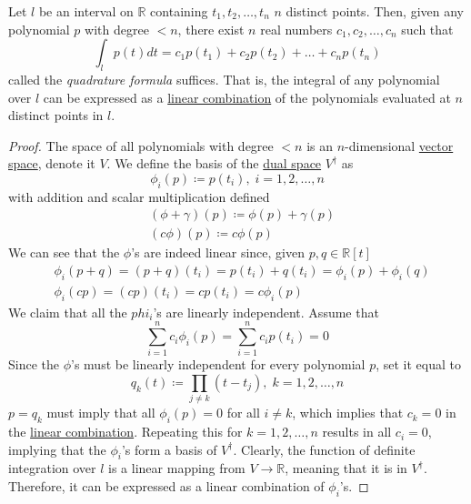  \begin{theorem}
    \label{thm:quadrature-formula}
    Let $l$ be an interval on $\mathbb{R}$ containing $t_1, t_2, \ldots, t_n$ $n$ distinct points. Then, given any polynomial $p$ with degree $< n$, there exist $n$ real numbers $c_1, c_2, \ldots, c_n$ such that
    \begin{equation}
      \int_l p(t) d t = c_1 p(t_1) + c_2 p(t_2) + \ldots + c_n p(t_n)
    \end{equation}
    called the \textit{quadrature formula} suffices. That is, the integral of any polynomial over $l$ can be expressed as a \hyperref[def:linear-combination]{linear combination} of the polynomials evaluated at $n$ distinct points in $l$. 
  \end{theorem}
  \begin{proof}
    The space of all polynomials with degree $< n$ is an $n$-dimensional \hyperref[def:vector-space]{vector space}, denote it $V$. We define the basis of the \hyperref[def:dual-space]{dual space} $V^\dagger$ as 
    \begin{equation}
      \phi_i (p) \coloneqq p(t_i), \; i = 1, 2, \ldots, n
    \end{equation}
    with addition and scalar multiplication defined
    \begin{align*}
      & (\phi + \gamma) (p) \coloneqq \phi(p) + \gamma(p) \\
      & (c \phi) (p) \coloneqq c \phi (p) 
    \end{align*}
    We can see that the $\phi$'s are indeed linear since, given $p, q \in \mathbb{R}[t]$
    \begin{align*}
      & \phi_i (p + q) = (p + q) (t_i) = p(t_i) + q(t_i) = \phi_i (p) + \phi_i (q) \\
      & \phi_i (c p) = (c p) (t_i) = c p(t_i) = c \phi_i (p)
    \end{align*}
    We claim that all the $phi_i$'s are linearly independent. Assume that 
    \begin{equation}
      \sum_{i=1}^n c_i \phi_i (p) = \sum_{i=1}^n c_i p(t_i) = 0
    \end{equation}
    Since the $\phi$'s must be linearly independent for every polynomial $p$, set it equal to
    \begin{equation}
      q_k (t) \coloneqq \prod_{j \neq k} (t - t_j), \; k = 1, 2, \ldots, n
    \end{equation}
    $p = q_k$ must imply that all $\phi_i (p) = 0$ for all $i \neq k$, which implies that $c_k = 0$ in the \hyperref[def:linear-combination]{linear combination}. Repeating this for $k = 1, 2, \ldots, n$ results in all $c_i = 0$, implying that the $\phi_i$'s form a basis of $V^\dagger$. Clearly, the function of definite integration over $l$ is a linear mapping from $V \to \mathbb{R}$, meaning that it is in $V^\dagger$. Therefore, it can be expressed as a linear combination of $\phi_i$'s. 
  \end{proof}

